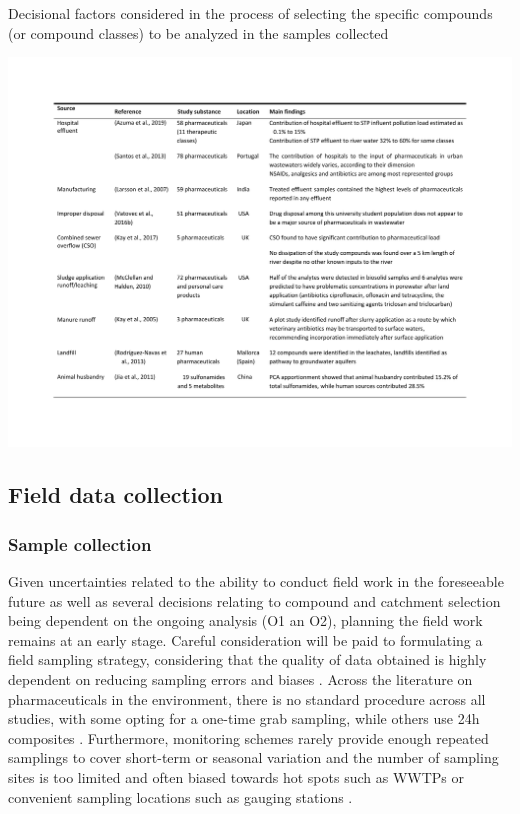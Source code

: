\documentclass{article}
\begin{document}
\begin{table}[t]
    \centering
    \caption{Decisional factors considered in the process of selecting the specific compounds (or compound classes) to be analyzed in the samples collected}
    \includegraphics[page=3,width=\linewidth,trim=2cm 11cm 2cm 4cm, clip]{just tables.pdf}
    
    \label{table_compound_choice}
\end{table}
\nocite{Burns2018ApplicationPharmaceuticals}

\clearpage
\subsection{Field data collection}
\subsubsection{Sample collection}
Given uncertainties related to the ability to conduct field work in the foreseeable future as well as several decisions relating to compound and catchment selection being dependent on the ongoing analysis (O1 an O2), planning the field work remains at an early stage. Careful consideration will be paid to formulating a field sampling strategy, considering that the quality of data obtained is highly dependent on reducing sampling errors and biases \citep{Ort2010SamplingReview}. Across the literature on pharmaceuticals in the environment, there is no standard procedure across all studies, with some opting for a one-time grab sampling, while others use 24h composites \citep{Verlicchi2012OccurrenceReview}. Furthermore, monitoring schemes rarely provide enough repeated samplings to cover short-term or seasonal variation \citep{Ort2010SamplingReview} and the number of sampling sites is too limited and often biased towards  hot spots such as WWTPs or convenient sampling locations such as gauging stations \citep{ausderBeek2016PharmaceuticalsPerspectives}. 
\end{document}
